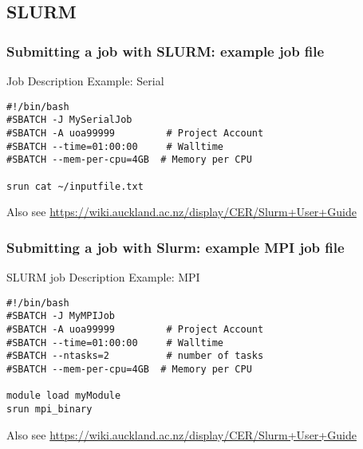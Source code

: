 \documentclass{beamer}
\begin{document}
\subsection{SLURM}



\begin{frame}
  \frametitle{Submitting a job with SLURM: example job file}
\begin{block}{Job Description Example: Serial}
\begin{scriptsize}
\begin{verbatim}
#!/bin/bash
#SBATCH -J MySerialJob
#SBATCH -A uoa99999         # Project Account
#SBATCH --time=01:00:00     # Walltime
#SBATCH --mem-per-cpu=4GB  # Memory per CPU 

srun cat ~/inputfile.txt
\end{verbatim}
\end{scriptsize}
  \end{block}
{\tiny Also see \url{https://wiki.auckland.ac.nz/display/CER/Slurm+User+Guide}}
\end{frame}


\begin{frame}
  \frametitle{Submitting a job with Slurm: example MPI job file}
     \begin{block}{SLURM job Description Example: MPI}
\begin{scriptsize}
\begin{verbatim}
#!/bin/bash
#SBATCH -J MyMPIJob
#SBATCH -A uoa99999         # Project Account
#SBATCH --time=01:00:00     # Walltime
#SBATCH --ntasks=2          # number of tasks
#SBATCH --mem-per-cpu=4GB  # Memory per CPU

module load myModule
srun mpi_binary
\end{verbatim}
\end{scriptsize}
  \end{block}
  
{\tiny Also see \url{https://wiki.auckland.ac.nz/display/CER/Slurm+User+Guide}}
\end{frame}
\end{document}
